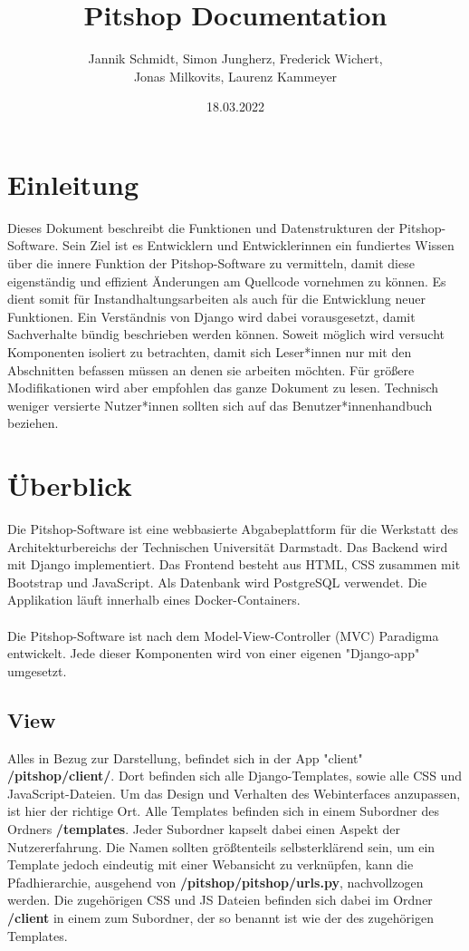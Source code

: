 \documentclass[12pt]{article}
\title{Pitshop Documentation}
\author{Jannik Schmidt, Simon Jungherz, Frederick Wichert, \\ Jonas Milkovits, Laurenz Kammeyer}
\date{18.03.2022}
\newcommand{\dir}[1]{\textbf{/#1}}
\begin{document}
\maketitle  

\section*{Einleitung}
Dieses Dokument beschreibt die Funktionen und Datenstrukturen der Pitshop-Software. Sein Ziel ist es Entwicklern und Entwicklerinnen 
ein fundiertes Wissen über die innere Funktion der Pitshop-Software zu vermitteln, damit diese eigenständig und effizient Änderungen 
am Quellcode vornehmen zu können. Es dient somit für Instandhaltungsarbeiten als auch für die Entwicklung neuer Funktionen.
Ein Verständnis von Django wird dabei vorausgesetzt, damit Sachverhalte bündig beschrieben werden können.
Soweit möglich wird versucht Komponenten isoliert zu betrachten, damit sich Leser*innen nur mit den Abschnitten befassen müssen an denen 
sie arbeiten möchten. Für größere Modifikationen wird aber empfohlen das ganze Dokument zu lesen.
Technisch weniger versierte Nutzer*innen sollten sich auf das Benutzer*innenhandbuch beziehen.

\newpage

\section*{Überblick}
Die Pitshop-Software ist eine webbasierte Abgabeplattform für die Werkstatt des Architekturbereichs der Technischen Universität Darmstadt.
Das Backend wird mit Django implementiert. Das Frontend besteht aus HTML, CSS zusammen mit Bootstrap und JavaScript. Als Datenbank wird PostgreSQL verwendet.
Die Applikation läuft innerhalb eines Docker-Containers.
\\
\\
Die Pitshop-Software ist nach dem Model-View-Controller (MVC) Paradigma entwickelt. Jede dieser Komponenten wird von einer eigenen "Django-app"
umgesetzt.

\subsection{View}
Alles in Bezug zur Darstellung, befindet sich in der App "client" \dir{pitshop/client/}. Dort befinden sich alle Django-Templates, sowie alle
CSS und JavaScript-Dateien. Um das Design und Verhalten des Webinterfaces anzupassen, ist hier der richtige Ort.
Alle Templates befinden sich in einem Subordner des Ordners \dir{templates}. Jeder Subordner kapselt dabei einen Aspekt der Nutzererfahrung.
Die Namen sollten größtenteils selbsterklärend sein, um ein Template jedoch eindeutig mit einer Webansicht zu verknüpfen, kann die Pfadhierarchie,
ausgehend von \dir{pitshop/pitshop/urls.py}, nachvollzogen werden.
Die zugehörigen CSS und JS Dateien befinden sich dabei im Ordner \dir{client} in einem zum Subordner, der so benannt ist wie der des zugehörigen Templates.
\end{document}

